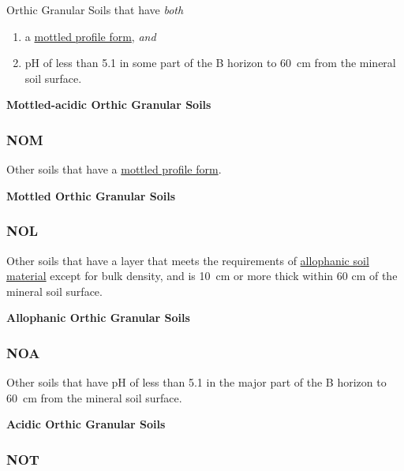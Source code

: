 \documentclass[
  letterpaper,
  DIV=11,
  numbers=noendperiod]{scrreprt}
\providecommand{\tightlist}{%
  \setlength{\itemsep}{0pt}\setlength{\parskip}{0pt}}\usepackage{longtable,booktabs,array}
\begin{document}
Orthic Granular Soils that have \emph{both}

\begin{enumerate}
\def\labelenumi{\arabic{enumi}.}
\tightlist
\item
  a \protect\hyperlink{sec-diag-mottpf}{mottled profile form},
  \emph{and}
\item
  pH of less than 5.1 in some part of the B horizon to 60~cm from the
  mineral soil surface.
\end{enumerate}

\textbf{Mottled-acidic Orthic Granular Soils}

\hypertarget{sec-key-NOM}{%
\subsubsection{\texorpdfstring{\textbf{NOM}}{NOM}}\label{sec-key-NOM}}

Other soils that have a \protect\hyperlink{sec-diag-mottpf}{mottled
profile form}.

\textbf{Mottled Orthic Granular Soils}

\hypertarget{sec-key-NOL}{%
\subsubsection{\texorpdfstring{\textbf{NOL}}{NOL}}\label{sec-key-NOL}}

Other soils that have a layer that meets the requirements of
\protect\hyperlink{sec-diag-alloph}{allophanic soil material} except for
bulk density, and is 10~cm or more thick within 60 cm of the mineral
soil surface.

\textbf{Allophanic Orthic Granular Soils}

\hypertarget{sec-key-NOA}{%
\subsubsection{\texorpdfstring{\textbf{NOA}}{NOA}}\label{sec-key-NOA}}

Other soils that have pH of less than 5.1 in the major part of the B
horizon to 60~cm from the mineral soil surface.

\textbf{Acidic Orthic Granular Soils}

\hypertarget{sec-key-NOT}{%
\subsubsection{\texorpdfstring{\textbf{NOT}}{NOT}}\label{sec-key-NOT}}
\end{document}
